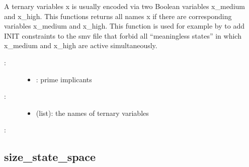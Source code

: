 \documentclass[letterpaper,10pt,english]{sphinxmanual}
\begin{document}
\begin{fulllineitems}
\label{\detokenize{PrimeImplicants:PyBoolNet.PrimeImplicants.find_vanham_variables}}
A ternary variables x is usually encoded via two Boolean variables x\_medium and x\_high.
This functions returns all names x if there are corresponding variables x\_medium and x\_high.
This function is used for example by {\hyperref[\detokenize{ModelChecking:primes2smv}]{}} to add
INIT constraints to the smv file that forbid all “meaningless states” in which x\_medium and x\_high
are active simultaneously.
\begin{description}
\item[{:}] \leavevmode\begin{itemize}
\item {} 
: prime implicants

\end{itemize}

\item[{:}] \leavevmode\begin{itemize}
\item {} 
 (list): the names of ternary variables

\end{itemize}

\end{description}

:

\begin{sphinxVerbatim}[commandchars=\\\{\}]
\end{sphinxVerbatim}

\end{fulllineitems}



\subsection{size\_state\_space}
\label{\detokenize{PrimeImplicants:id7}}\label{\detokenize{PrimeImplicants:size-state-space}}
\end{document}
